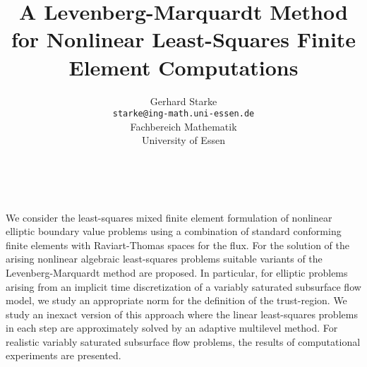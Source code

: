 \documentclass[11pt]{article}
\date{ ~ \hspace{-4mm}}
\title{A Levenberg-Marquardt Method for Nonlinear Least-Squares Finite Element Computations  }
\author{Gerhard Starke \\ {\tt  starke@ing-math.uni-essen.de} \\ Fachbereich Mathematik \\ University of Essen}
\begin{document}
\maketitle
\thispagestyle{empty}





 



We consider the least-squares mixed finite element formulation of
nonlinear elliptic boundary value problems using a combination of
standard conforming finite elements with Raviart-Thomas spaces for
the flux. For the solution of the
arising nonlinear algebraic least-squares problems suitable variants of the
Levenberg-Marquardt method are proposed. In particular, for elliptic
problems arising from an implicit time discretization
of a variably saturated subsurface flow model, we study an appropriate
norm for the definition of the trust-region. 
We study an inexact version of
this approach where the linear least-squares problems in each step are
approximately solved by an adaptive multilevel method.
For realistic variably saturated subsurface flow problems, the results
of computational experiments are presented.
\end{document}
